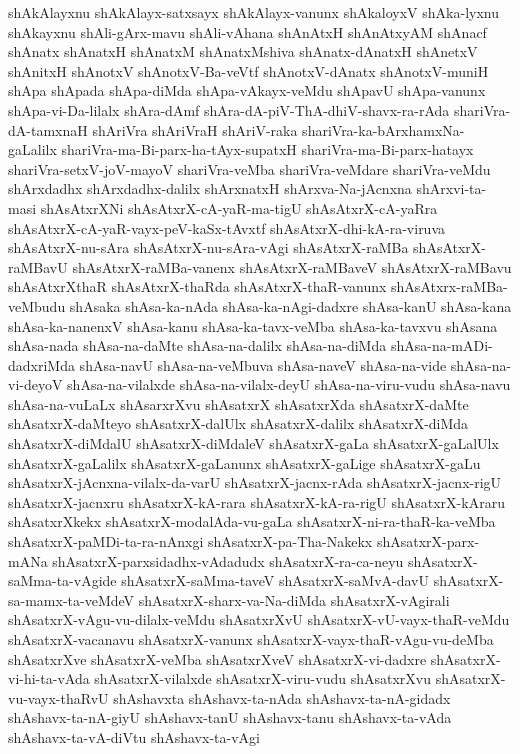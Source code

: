 {shAkAlayxnu
shAkAlayx-satxsayx
shAkAlayx-vanunx
shAkaloyxV
shAka-lyxnu
shAkayxnu
shAli-gArx-mavu
shAli-vAhana
shAnAtxH
shAnAtxyAM
shAnacf
shAnatx
shAnatxH
shAnatxM
shAnatxMshiva
shAnatx-dAnatxH
shAnetxV
shAnitxH
shAnotxV
shAnotxV-Ba-veVtf
shAnotxV-dAnatx
shAnotxV-muniH
shApa
shApada
shApa-diMda
shApa-vAkayx-veMdu
shApavU
shApa-vanunx
shApa-vi-Da-lilalx
shAra-dAmf
shAra-dA-piV-ThA-dhiV-shavx-ra-rAda
shariVra-dA-tamxnaH
shAriVra
shAriVraH
shAriV-raka
shariVra-ka-bArxhamxNa-gaLalilx
shariVra-ma-Bi-parx-ha-tAyx-supatxH
shariVra-ma-Bi-parx-hatayx
shariVra-setxV-joV-mayoV
shariVra-veMba
shariVra-veMdare
shariVra-veMdu
shArxdadhx
shArxdadhx-dalilx
shArxnatxH
shArxva-Na-jAcnxna
shArxvi-ta-masi
shAsAtxrXNi
shAsAtxrX-cA-yaR-ma-tigU
shAsAtxrX-cA-yaRra
shAsAtxrX-cA-yaR-vayx-peV-kaSx-tAvxtf
shAsAtxrX-dhi-kA-ra-viruva
shAsAtxrX-nu-sAra
shAsAtxrX-nu-sAra-vAgi
shAsAtxrX-raMBa
shAsAtxrX-raMBavU
shAsAtxrX-raMBa-vanenx
shAsAtxrX-raMBaveV
shAsAtxrX-raMBavu
shAsAtxrXthaR
shAsAtxrX-thaRda
shAsAtxrX-thaR-vanunx
shAsAtxrx-raMBa-veMbudu
shAsaka
shAsa-ka-nAda
shAsa-ka-nAgi-dadxre
shAsa-kanU
shAsa-kana
shAsa-ka-nanenxV
shAsa-kanu
shAsa-ka-tavx-veMba
shAsa-ka-tavxvu
shAsana
shAsa-nada
shAsa-na-daMte
shAsa-na-dalilx
shAsa-na-diMda
shAsa-na-mADi-dadxriMda
shAsa-navU
shAsa-na-veMbuva
shAsa-naveV
shAsa-na-vide
shAsa-na-vi-deyoV
shAsa-na-vilalxde
shAsa-na-vilalx-deyU
shAsa-na-viru-vudu
shAsa-navu
shAsa-na-vuLaLx
shAsarxrXvu
shAsatxrX
shAsatxrXda
shAsatxrX-daMte
shAsatxrX-daMteyo
shAsatxrX-dalUlx
shAsatxrX-dalilx
shAsatxrX-diMda
shAsatxrX-diMdalU
shAsatxrX-diMdaleV
shAsatxrX-gaLa
shAsatxrX-gaLalUlx
shAsatxrX-gaLalilx
shAsatxrX-gaLanunx
shAsatxrX-gaLige
shAsatxrX-gaLu
shAsatxrX-jAcnxna-vilalx-da-varU
shAsatxrX-jacnx-rAda
shAsatxrX-jacnx-rigU
shAsatxrX-jacnxru
shAsatxrX-kA-rara
shAsatxrX-kA-ra-rigU
shAsatxrX-kAraru
shAsatxrXkekx
shAsatxrX-modalAda-vu-gaLa
shAsatxrX-ni-ra-thaR-ka-veMba
shAsatxrX-paMDi-ta-ra-nAnxgi
shAsatxrX-pa-Tha-Nakekx
shAsatxrX-parx-mANa
shAsatxrX-parxsidadhx-vAdadudx
shAsatxrX-ra-ca-neyu
shAsatxrX-saMma-ta-vAgide
shAsatxrX-saMma-taveV
shAsatxrX-saMvA-davU
shAsatxrX-sa-mamx-ta-veMdeV
shAsatxrX-sharx-va-Na-diMda
shAsatxrX-vAgirali
shAsatxrX-vAgu-vu-dilalx-veMdu
shAsatxrXvU
shAsatxrX-vU-vayx-thaR-veMdu
shAsatxrX-vacanavu
shAsatxrX-vanunx
shAsatxrX-vayx-thaR-vAgu-vu-deMba
shAsatxrXve
shAsatxrX-veMba
shAsatxrXveV
shAsatxrX-vi-dadxre
shAsatxrX-vi-hi-ta-vAda
shAsatxrX-vilalxde
shAsatxrX-viru-vudu
shAsatxrXvu
shAsatxrX-vu-vayx-thaRvU
shAshavxta
shAshavx-ta-nAda
shAshavx-ta-nA-gidadx
shAshavx-ta-nA-giyU
shAshavx-tanU
shAshavx-tanu
shAshavx-ta-vAda
shAshavx-ta-vA-diVtu
shAshavx-ta-vAgi
}
